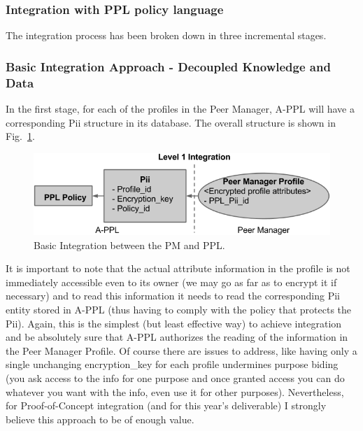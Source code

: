 \subsubsection{Integration with PPL policy language}
The integration process has been broken down in three incremental stages. 
\subsubsection{Basic Integration Approach - Decoupled Knowledge and Data}
In the first stage, for each of the profiles in the Peer Manager, A-PPL will have a corresponding Pii structure in its database. The overall structure is shown in Fig.~\ref{fig:pm-ppl-lv1.png}.

\begin{figure}[htb!]
\centering
\includegraphics[width=0.8\linewidth]{figures/pm-ppl-lv1.png}
\caption{Basic Integration between the PM and PPL.}
\label{fig:pm-ppl-lv1.png}
\end{figure}

It is important to note that the actual attribute information in the profile is not immediately accessible even to its owner (we may go as far as to encrypt it if necessary) and to read this information it needs to read the corresponding Pii entity stored in A-PPL (thus having to comply with the policy that protects the Pii).
Again, this is the simplest (but least effective way) to achieve integration and be absolutely sure that A-PPL authorizes the reading of the information in the Peer Manager Profile.
Of course there are issues to address, like having only a single unchanging encryption\_key for  each profile undermines purpose biding (you ask access to the info for one purpose and once granted access you can do whatever you want with the info, even use it for other purposes). Nevertheless, for Proof-of-Concept integration (and for this year's deliverable) I strongly believe this approach to be of enough value.

